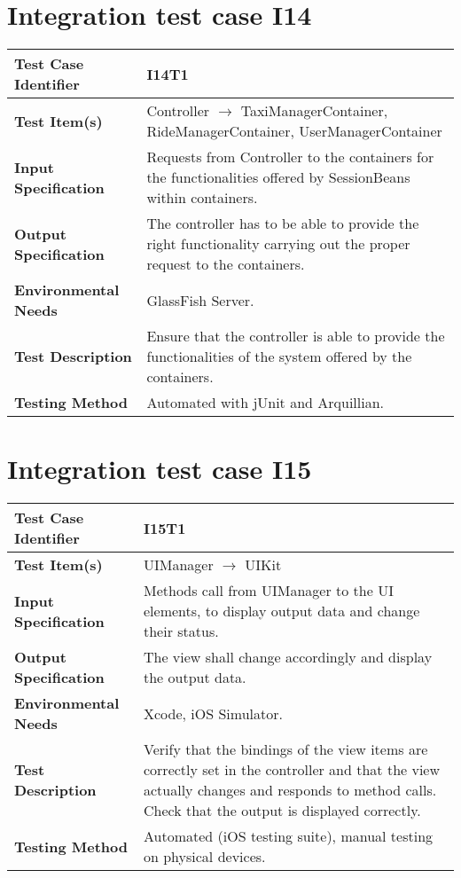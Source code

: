 \vspace{2em}

\section{Integration test case I14}

\begin{tabular}{l p{}}
    \hline
    \textbf{Test Case Identifier} & I14T1\\
    \hline
    \textbf{Test Item(s)} & Controller $\rightarrow$ TaxiManagerContainer, RideManagerContainer, UserManagerContainer \\
    \hline
    \textbf{Input Specification} & Requests from Controller to the containers for the functionalities offered by SessionBeans within containers.\\
    \hline
    \textbf{Output Specification} & The controller has to be able to provide the right functionality carrying out the proper request to the containers.\\
    \hline
    \textbf{Environmental Needs} & GlassFish Server.\\
    \hline
    \textbf{Test Description} & Ensure that the controller is able to provide the functionalities of the system offered by the containers.\\
    \hline
    \textbf{Testing Method} & Automated with jUnit and Arquillian.\\
    \hline
\end{tabular}

\vspace{2em}

\section{Integration test case I15}

\begin{tabular}{l p{}}
    \hline
    \textbf{Test Case Identifier} & I15T1\\
    \hline
    \textbf{Test Item(s)} & UIManager $\rightarrow$ UIKit \\
    \hline
    \textbf{Input Specification} & Methods call from UIManager to the UI elements, to display output data and change their status.\\
    \hline
    \textbf{Output Specification} & The view shall change accordingly and display the output data.\\
    \hline
    \textbf{Environmental Needs} & Xcode, iOS Simulator.\\
    \hline
    \textbf{Test Description} & Verify that the bindings of the view items are correctly set in the controller and that the view actually changes and responds to method calls. Check that the output is displayed correctly.\\
    \hline
    \textbf{Testing Method} & Automated (iOS testing suite), manual testing on physical devices. \\
    \hline
\end{tabular}

